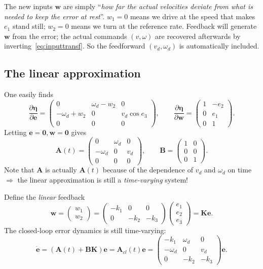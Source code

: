 \documentclass[11pt,a4paper]{article}
\newcommand{\vect}[1]{\bm{#1}}
\newcommand{\vd}{v_d}
\newcommand{\omd}{\omega_d}
\newcommand{\Acl}{\vect{A}_{cl}}
\theoremstyle{plain}
\theoremstyle{definition}
\theoremstyle{remark}
\begin{document}
\begin{intuition}
The new inputs $\vect w$ are simply ``\emph{how far the actual velocities deviate from what is needed to keep the error at rest}''. $w_1=0$ means we drive at the speed that makes $e_1$ stand still; $w_2=0$ means we turn at the reference rate. Feedback will generate $\vect w$ from the error; the actual commands $(v,\omega)$ are recovered afterwards by inverting~\eqref{eq:inputtransf}. So the feedforward $(\vd,\omd)$ is automatically included.
\end{intuition}

\subsection{The linear approximation}

One easily finds
\[
\frac{\partial\vect\eta}{\partial\vect e}=\begin{pmatrix}0&\omd-w_2&0\\-\omd+w_2&0&\vd\cos e_3\\0&0&0\end{pmatrix},\qquad
\frac{\partial\vect\eta}{\partial\vect w}=\begin{pmatrix}1&-e_2\\0&e_1\\0&1\end{pmatrix}.
\]
Letting $\vect e=\vect 0,\vect w=\vect 0$ gives
\[
\vect A(t)=\begin{pmatrix}0&\omd&0\\-\omd&0&\vd\\0&0&0\end{pmatrix},\qquad
\vect B=\begin{pmatrix}1&0\\0&0\\0&1\end{pmatrix}.
\]
Note that $\vect A$ is actually $\vect A(t)$ because of the dependence of $\vd$ and $\omd$ on time $\Rightarrow$ the linear approximation is still a \emph{time-varying} system!

Define the \emph{linear} feedback
\[
\vect w=\begin{pmatrix}w_1\\w_2\end{pmatrix}=\begin{pmatrix}-k_1&0&0\\0&-k_2&-k_3\end{pmatrix}\begin{pmatrix}e_1\\e_2\\e_3\end{pmatrix}=\vect K\vect e .
\]
The closed-loop error dynamics is still time-varying:
\begin{equation}\label{eq:Acl}
\dot{\vect e}=(\vect A(t)+\vect B\vect K)\vect e=\Acl(t)\vect e=\begin{pmatrix}-k_1&\omd&0\\-\omd&0&\vd\\0&-k_2&-k_3\end{pmatrix}\vect e .
\end{equation}
\end{document}
